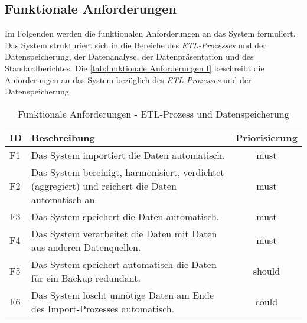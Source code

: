 

\subsection{Funktionale Anforderungen}
Im Folgenden werden die funktionalen Anforderungen an das System formuliert. Das System strukturiert sich in die Bereiche des \textit{\acrshort{ETL}-Prozesses} und der
Datenspeicherung, der Datenanalyse, der Datenpräsentation und des Standardberichtes.
Die \autoref{tab:funktionale Anforderungen I} beschreibt die Anforderungen an das System bezüglich des \textit{\acrshort{ETL}-Prozesses} und der Datenspeicherung.

\begingroup
\setlength{\tabcolsep}{10pt} %
\renewcommand{\arraystretch}{1.0}
\begin{table}[H]
    \centering
    \begin{adjustbox}{max width=\textwidth}
    \begin{tabular}{lp{14cm}c}
       \toprule
       \textbf{ID}          & \textbf{Beschreibung} &\textbf{Priorisierung}\\
       \midrule
        F1                               &Das System importiert die Daten automatisch. & must\\
        F2                              &Das System bereinigt, harmonisiert, verdichtet (aggregiert) und reichert die Daten automatisch an. & must\\
        F3                               &Das System speichert die Daten automatisch.  & must\\
        F4                              &Das System verarbeitet die Daten mit Daten aus anderen Datenquellen.  & must\\
        F5                              &Das System speichert automatisch die Daten für ein Backup redundant.  & should\\
        F6                             &Das System löscht unnötige Daten am Ende des Import-Prozesses automatisch.  & could\\
    \bottomrule
    \end{tabular}
    \end{adjustbox}
    \caption{%
        Funktionale Anforderungen - ETL-Prozess und Datenspeicherung
    }
    \label{tab:funktionale Anforderungen I}
    \end{table}
\endgroup

